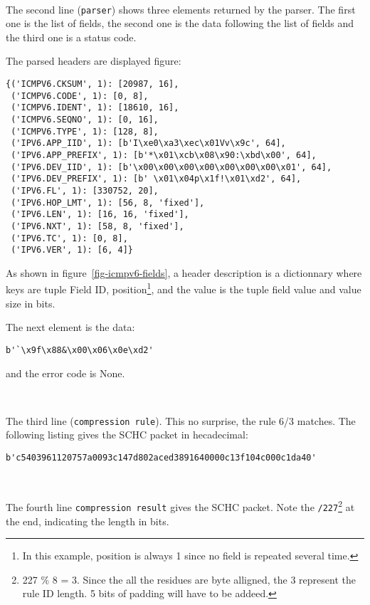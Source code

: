 \documentclass[onecolumn,12pt]{book}
\newcounter{c}
\begin{document}
~  

The second line (\texttt{parser}) shows three elements returned by the parser. The first one is the list of fields, the second one is the data following the list of fields and the third one is a status code.

The parsed headers are displayed figure:

\begin{lstlisting}[caption={Header Fields of an ICMPv6 message}, label=fig-icmpv6-fields]
{('ICMPV6.CKSUM', 1): [20987, 16],
 ('ICMPV6.CODE', 1): [0, 8],
 ('ICMPV6.IDENT', 1): [18610, 16],
 ('ICMPV6.SEQNO', 1): [0, 16],
 ('ICMPV6.TYPE', 1): [128, 8],
 ('IPV6.APP_IID', 1): [b'I\xe0\xa3\xec\x01Vv\x9c', 64],
 ('IPV6.APP_PREFIX', 1): [b'*\x01\xcb\x08\x90:\xbd\x00', 64],
 ('IPV6.DEV_IID', 1): [b'\x00\x00\x00\x00\x00\x00\x00\x01', 64],
 ('IPV6.DEV_PREFIX', 1): [b' \x01\x04p\x1f!\x01\xd2', 64],
 ('IPV6.FL', 1): [330752, 20],
 ('IPV6.HOP_LMT', 1): [56, 8, 'fixed'],
 ('IPV6.LEN', 1): [16, 16, 'fixed'],
 ('IPV6.NXT', 1): [58, 8, 'fixed'],
 ('IPV6.TC', 1): [0, 8],
 ('IPV6.VER', 1): [6, 4]}
\end{lstlisting}

As shown in figure~\vref{fig-icmpv6-fields}, a header description is a dictionnary where keys are tuple Field ID, position\footnote{In this example, position is always 1 since no field is repeated several time.}, and the value is the tuple field value and value size in bits.

The next element is the data:

\begin{lstlisting}
b'`\x9f\x88&\x00\x06\x0e\xd2'
\end{lstlisting}

and the error code is None.

~~

The third line (\texttt{compression rule}). This no surprise, the rule 6/3 matches. The following listing gives the SCHC packet in hecadecimal:


\begin{lstlisting}
b'c5403961120757a0093c147d802aced3891640000c13f104c000c1da40'
\end{lstlisting}

~~~

The fourth line \texttt{compression result} gives the SCHC packet. Note the \texttt{/227}\footnote {227 \% 8 = 3.  Since the all the residues are byte alligned, the 3 represent the rule ID length. 5 bits of padding will have to be addeed.} at the end, indicating the length in bits. 
\end{document}
